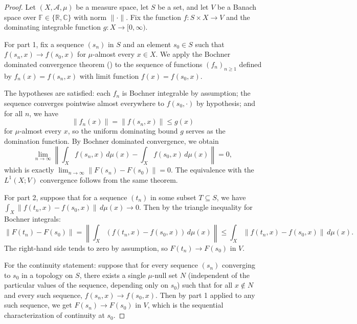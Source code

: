 \begin{proof}
Let $(X, \mathcal{A}, \mu)$ be a measure space, let $S$ be a set, and let $V$ be a Banach space over $\mathbb{F} \in \{\mathbb{R}, \mathbb{C}\}$ with norm $\|\cdot\|$. Fix the function $f : S \times X \to V$ and the dominating integrable function $g : X \to [0, \infty)$.

For part 1, fix a sequence $(s_n)$ in $S$ and an element $s_0 \in S$ such that $f(s_n, x) \to f(s_0, x)$ for $\mu$-almost every $x \in X$. We apply the Bochner dominated convergence theorem () to the sequence of functions $(f_n)_{n \geq 1}$ defined by $f_n(x) = f(s_n, x)$ with limit function $f(x) = f(s_0, x)$.

The hypotheses are satisfied: each $f_n$ is Bochner integrable by assumption; the sequence converges pointwise almost everywhere to $f(s_0, \cdot)$ by hypothesis; and for all $n$, we have
$$\|f_n(x)\| = \|f(s_n, x)\| \leq g(x)$$
for $\mu$-almost every $x$, so the uniform dominating bound $g$ serves as the domination function. By Bochner dominated convergence, we obtain
$$\lim_{n \to \infty} \left\| \int_X f(s_n, x)\,d\mu(x) - \int_X f(s_0, x)\,d\mu(x) \right\| = 0,$$
which is exactly $\lim_{n \to \infty} \|F(s_n) - F(s_0)\| = 0$. The equivalence with the $L^1(X; V)$ convergence follows from the same theorem.

For part 2, suppose that for a sequence $(t_n)$ in some subset $T \subseteq S$, we have $\int_X \|f(t_n, x) - f(s_0, x)\|\,d\mu(x) \to 0$. Then by the triangle inequality for Bochner integrals:
$$\|F(t_n) - F(s_0)\| = \left\| \int_X (f(t_n, x) - f(s_0, x))\,d\mu(x) \right\| \leq \int_X \|f(t_n, x) - f(s_0, x)\|\,d\mu(x).$$
The right-hand side tends to zero by assumption, so $F(t_n) \to F(s_0)$ in $V$.

For the continuity statement: suppose that for every sequence $(s_n)$ converging to $s_0$ in a topology on $S$, there exists a single $\mu$-null set $N$ (independent of the particular values of the sequence, depending only on $s_0$) such that for all $x \notin N$ and every such sequence, $f(s_n, x) \to f(s_0, x)$. Then by part 1 applied to any such sequence, we get $F(s_n) \to F(s_0)$ in $V$, which is the sequential characterization of continuity at $s_0$.
\end{proof}